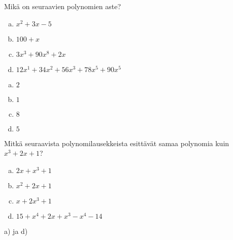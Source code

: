 \begin{tehtava}
	Mikä on seuraavien polynomien aste?
	\begin{enumerate}[a)]
		\item $x^2 + 3x - 5$
		\item $100 + x$
		\item $3x^3 + 90x^8 + 2x$
		\item $12x^1 + 34x^2 + 56x^3 + 78x^5 + 90x^5$
	\end{enumerate}

	\begin{vastaus}
		\begin{enumerate}[a)]
			\item $2$
			\item $1$
			\item $8$
			\item $5$
		\end{enumerate}
	\end{vastaus}
\end{tehtava}

%

\begin{tehtava}
	Mitkä seuraavista polynomilausekkeista esittävät samaa polynomia kuin
	$x^3+2x+1$?
	\begin{enumerate}[a)]
		\item $2x+x^3+1$
		\item $x^2+2x+1$
		\item $x+2x^3+1$
		\item $15+x^4+2x+x^3-x^4-14$
	\end{enumerate}
	\begin{vastaus}
		a) ja d)
	\end{vastaus}
\end{tehtava}
